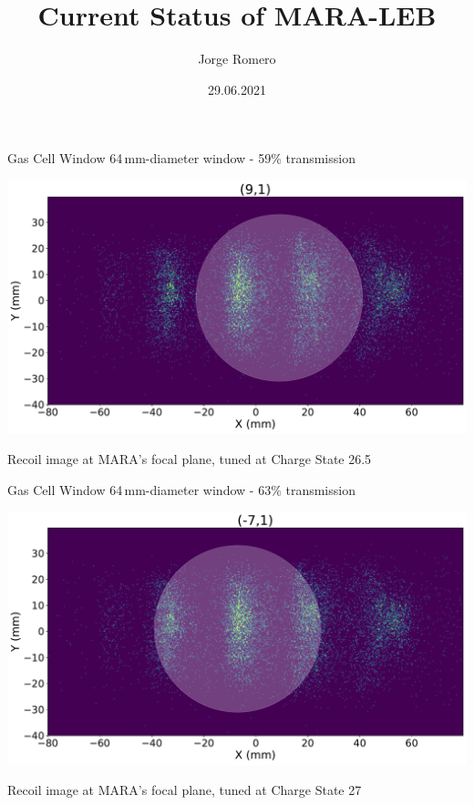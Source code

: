 \documentclass{beamer}
\title{Current Status of MARA-LEB}
\date{29.06.2021}
\author[auth]{Jorge Romero}
\begin{document}
\begin{frame}
\titlepage
\end{frame}
\begin{frame}{Gas Cell Window}
    \centering
    \vspace*{3em}
    64\,mm-diameter window - 59\% transmission

    \includegraphics[width=\textwidth]{Window2states.pdf} 
    
    Recoil image at MARA's focal plane, tuned at Charge State 26.5
\end{frame}
\begin{frame}{Gas Cell Window}
    \centering
    \vspace*{3em}
    64\,mm-diameter window - 63\% transmission  

    \includegraphics[width=\textwidth]{Window3states.pdf} 
    
    Recoil image at MARA's focal plane, tuned at Charge State 27
\end{frame}
\end{document}
